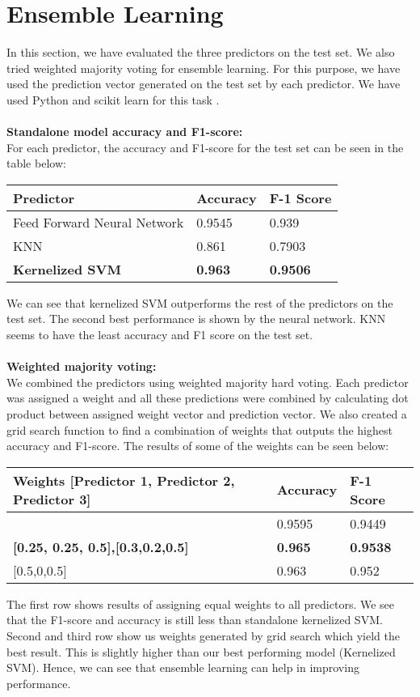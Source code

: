 \documentclass{article}
\newcommand{\enterProblemHeader}[1]{
\nobreak\extramarks{#1}{#1}\nobreak
\nobreak\extramarks{#1}{#1}\nobreak
}
\newcommand{\exitProblemHeader}[1]{
\nobreak\extramarks{#1}{#1}\nobreak
\nobreak\extramarks{#1}{}\nobreak
}
\newcounter{homeworkProblemCounter} %
\newcommand{\homeworkProblemName}{}
\newenvironment{homeworkProblem}[1][Problem \arabic{homeworkProblemCounter}]{ %
\stepcounter{homeworkProblemCounter} %
\renewcommand{\homeworkProblemName}{#1} %
\section{\homeworkProblemName} %
\enterProblemHeader{} %
}{
\exitProblemHeader{} %
}
\begin{document}
\clearpage
\begin{homeworkProblem}[Ensemble Learning]
In this section, we have evaluated the three predictors on the test set. We also tried weighted majority voting for ensemble learning. For this purpose, we have used the prediction vector generated on the test set by each predictor. We have used Python and scikit learn for this task \cite{knn}.
\\
\\
\textbf{Standalone model accuracy and F1-score:}
\\
For each predictor, the accuracy and F1-score for the test set can be seen in the table below:

\begin{center}
\begin{tabular}{@{}lll@{}}
\textbf{Predictor} & \textbf{Accuracy} & \textbf{F-1 Score}\\
\hline
Feed Forward Neural Network &	0.9545	&0.939\\
KNN &	0.861 &	0.7903                        \\
\textbf{Kernelized SVM} &	\textbf{0.963}	 & \textbf{0.9506}  
\end{tabular}
\end{center}

We can see that kernelized SVM outperforms the rest of the predictors on the test set. The second best performance is shown by the neural network. KNN seems to have the least accuracy and F1 score on the test set. 
\\
\\
\textbf{Weighted majority voting:}
\\
We combined the predictors using weighted majority hard voting. Each predictor was assigned a weight and all these predictions were combined by calculating dot product between assigned weight vector and prediction vector. We also created a grid search function to find a combination of weights that outputs the highest accuracy and F1-score. The results of some of the weights can be seen below:

\begin{center}
\begin{tabular}{@{}lll@{}}
\textbf{Weights [Predictor 1, Predictor 2, Predictor 3]} & \textbf{Accuracy} & \textbf{F-1 Score}\\
\hline
[0.333,0.333,0.333] &	0.9595	&0.9449\\
\textbf{[0.25, 0.25, 0.5],[0.3,0.2,0.5]} &	\textbf{0.965} &	\textbf{0.9538}     \\
{[0.5,0,0.5]} &    0.963   &0.952    \relax

\end{tabular}
\end{center}

The first row  shows results of assigning equal weights to all predictors. We see that the F1-score and accuracy is still less than standalone kernelized SVM. Second and third row show us weights generated by grid search which yield the best result. This is slightly higher than our best performing model (Kernelized SVM). Hence, we can see that ensemble learning can help in improving performance.

\end{homeworkProblem}
\end{document}
